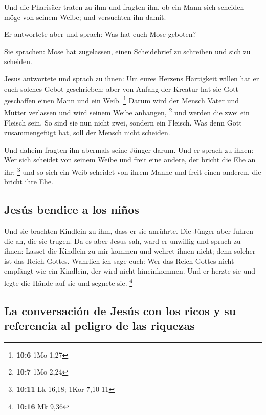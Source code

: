  Und die Pharisäer traten zu ihm und fragten ihn, ob ein
Mann sich scheiden möge von seinem Weibe; und versuchten ihn damit.

 Er antwortete aber und sprach: Was hat euch Mose geboten?

 Sie sprachen: Mose hat zugelassen, einen Scheidebrief zu
schreiben und sich zu scheiden.

 Jesus antwortete und sprach zu ihnen: Um eures Herzens
Härtigkeit willen hat er euch solches Gebot geschrieben; 
aber von Anfang der Kreatur hat sie Gott geschaffen einen Mann und ein
Weib. \footnote{\textbf{10:6} 1Mo 1,27}  Darum wird der
Mensch Vater und Mutter verlassen und wird seinem Weibe anhangen,
\footnote{\textbf{10:7} 1Mo 2,24}  und werden die zwei ein
Fleisch sein. So sind sie nun nicht zwei, sondern ein Fleisch.
 Was denn Gott zusammengefügt hat, soll der Mensch nicht
scheiden.

 Und daheim fragten ihn abermals seine Jünger darum.
 Und er sprach zu ihnen: Wer sich scheidet von seinem
Weibe und freit eine andere, der bricht die Ehe an ihr; \footnote{\textbf{10:11}
  Lk 16,18; 1Kor 7,10-11}  und so sich ein Weib scheidet
von ihrem Manne und freit einen anderen, die bricht ihre Ehe.

\hypertarget{jesuxfas-bendice-a-los-niuxf1os}{%
\subsection{Jesús bendice a los
niños}\label{jesuxfas-bendice-a-los-niuxf1os}}

 Und sie brachten Kindlein zu ihm, dass er sie anrührte.
Die Jünger aber fuhren die an, die sie trugen.  Da es
aber Jesus sah, ward er unwillig und sprach zu ihnen: Lasset die
Kindlein zu mir kommen und wehret ihnen nicht; denn solcher ist das
Reich Gottes.  Wahrlich ich sage euch: Wer das Reich
Gottes nicht empfängt wie ein Kindlein, der wird nicht hineinkommen.
 Und er herzte sie und legte die Hände auf sie und
segnete sie. \footnote{\textbf{10:16} Mk 9,36}

\hypertarget{la-conversaciuxf3n-de-jesuxfas-con-los-ricos-y-su-referencia-al-peligro-de-las-riquezas}{%
\subsection{La conversación de Jesús con los ricos y su referencia al
peligro de las
riquezas}\label{la-conversaciuxf3n-de-jesuxfas-con-los-ricos-y-su-referencia-al-peligro-de-las-riquezas}}

